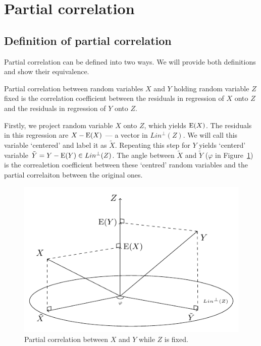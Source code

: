 \section{Partial correlation}

\subsection{Definition of partial correlation}


Partial correlation can be defined into two ways.
We will provide both definitions and show their equivalence.

\begin{definition}
Partial correlation between random variables $X$ and $Y$ holding random variable $Z$
fixed is the correlation coefficient between the residuals in regression of $X$ onto
$Z$ and the residuals in regression of $Y$ onto $Z$.
\end{definition}

Firstly, we project random variable $X$ onto $Z$, which yields $\operatorname{E}(X)$.
The residuals in this regression are $X - \operatorname{E}(X)$ — a vector in $Lin^{\perp}(Z)$.
We will call this variable `centered' and label it as $\widetilde X$.
Repeating this step for $Y$ yields `centerd' variable $\tilde Y = Y - \operatorname{E}(Y) \in Lin^{\perp}(Z)$.
The angle between $\widetilde X$ and $\widetilde Y$ ($\varphi$ in Figure~\ref{fig:pcorr_def1})
is the correaletion coefficient between these `centred' random variables and
the partial correlaiton between the original ones.

\begin{figure}
  \centering
  \includegraphics[width=0.55\linewidth]{figures/partial_corr.pdf}
  \caption{Partial correlation between $X$ and $Y$ while $Z$ is fixed.}
  \label{fig:pcorr_def1}
\end{figure}

